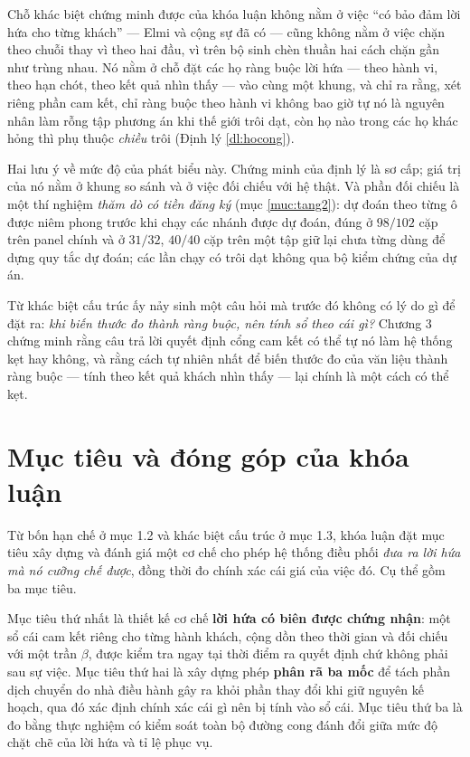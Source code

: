 \begin{khungy}
Chỗ khác biệt chứng minh được của khóa luận không nằm ở việc ``có bảo đảm lời hứa cho từng
khách'' --- Elmi và cộng sự đã có --- cũng không nằm ở việc chặn theo chuỗi thay vì theo hai đầu,
vì trên bộ sinh chèn thuần hai cách chặn gần như trùng nhau. Nó nằm ở chỗ đặt các họ ràng buộc lời
hứa --- theo hành vi, theo hạn chót, theo kết quả nhìn thấy --- vào cùng một khung, và chỉ ra rằng,
xét riêng phần cam kết, chỉ ràng buộc theo hành vi không bao giờ tự nó là nguyên nhân làm rỗng tập
phương án khi thế giới trôi dạt, còn họ nào trong các họ khác hỏng thì phụ thuộc \emph{chiều} trôi
(Định lý \ref{dl:hocong}).
\end{khungy}

Hai lưu ý về mức độ của phát biểu này. Chứng minh của định lý là sơ cấp; giá trị của nó nằm ở
khung so sánh và ở việc đối chiếu với hệ thật. Và phần đối chiếu là một thí nghiệm \emph{thăm dò có
tiền đăng ký} (mục \ref{muc:tang2}): dự đoán theo từng ô được niêm phong trước khi chạy các nhánh
được dự đoán, đúng ở $98/102$ cặp trên panel chính và ở $31/32$, $40/40$ cặp trên một tập giữ lại
chưa từng dùng để dựng quy tắc dự đoán; các lần chạy có trôi dạt không qua bộ kiểm chứng của dự án.

Từ khác biệt cấu trúc ấy nảy sinh một câu hỏi mà trước đó không có lý do gì để đặt ra:
\emph{khi biến thước đo thành ràng buộc, nên tính sổ theo cái gì?} Chương 3 chứng minh rằng câu
trả lời quyết định cổng cam kết có thể tự nó làm hệ thống kẹt hay không, và rằng cách tự nhiên
nhất để biến thước đo của văn liệu thành ràng buộc --- tính theo kết quả khách nhìn thấy --- lại
chính là một cách có thể kẹt.

\section{Mục tiêu và đóng góp của khóa luận}

Từ bốn hạn chế ở mục 1.2 và khác biệt cấu trúc ở mục 1.3, khóa luận đặt mục tiêu xây dựng và
đánh giá một cơ chế cho phép hệ thống điều phối \emph{đưa ra lời hứa mà nó cưỡng chế được},
đồng thời đo chính xác cái giá của việc đó. Cụ thể gồm ba mục tiêu.

Mục tiêu thứ nhất là thiết kế cơ chế \textbf{lời hứa có biên được chứng nhận}: một sổ cái cam
kết riêng cho từng hành khách, cộng dồn theo thời gian và đối chiếu với một trần $\beta$, được
kiểm tra ngay tại thời điểm ra quyết định chứ không phải sau sự việc. Mục tiêu thứ hai là xây
dựng phép \textbf{phân rã ba mốc} để tách phần dịch chuyển do nhà điều hành gây ra khỏi phần
thay đổi khi giữ nguyên kế hoạch, qua đó xác định chính xác cái gì nên bị tính vào sổ cái. Mục tiêu
thứ ba là đo bằng thực nghiệm có kiểm soát toàn bộ đường cong đánh đổi giữa mức độ chặt chẽ
của lời hứa và tỉ lệ phục vụ.


